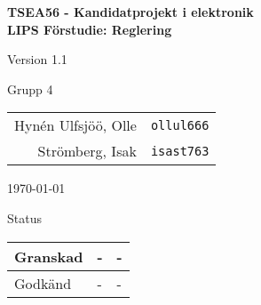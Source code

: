 \documentclass[11pt]{article}
\begin{document}
\begin{titlepage}
\begin{center}

{\Large\bfseries TSEA56 - Kandidatprojekt i elektronik \\ LIPS Förstudie: Reglering}

\vspace{5em}

Version 1.1

\vspace{5em}
Grupp 4 \\
\begin{tabular}{rl}
Hynén Ulfsjöö, Olle&\verb+ollul666+
\\
Strömberg, Isak&\verb+isast763+
\\
\end{tabular}

\vspace{5em}
\today

\vspace{16em}
Status
\begin{longtable}{|l|l|l|} \hline

Granskad & - & - \\ \hline
Godkänd & - & - \\ \hline
 
\end{longtable}

\end{center}
\end{titlepage}
\end{document}
